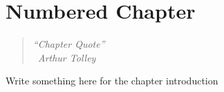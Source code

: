 \documentclass[a4paper,12pt,twoside]{report} %
\makeatletter
\newcommand{\chapterquote}[2]{
  \begin{quote}
    \color{darkgray}\itshape #1 \\[1ex] %
    \raggedleft %
    \textemdash\ #2
  \end{quote}
}
\renewcommand{\cleardoublepage}{%
  \clearpage%
  \if@twoside
    \ifodd\c@page
    \else
      \hbox{}%
      \thispagestyle{empty}%
      \newpage
    \fi
  \fi
}
\let\oldchapter\chapter
\renewcommand{\chapter}{\cleardoublepage\oldchapter}
\makeatother
\begin{document}
\chapter[Table of Contents Name Chapter]{\label{chapter:1-label}Numbered Chapter}
\chapterquote{``Chapter Quote''}{Arthur Tolley}
Write something here for the chapter introduction


\nocite{*} %





\end{document}
